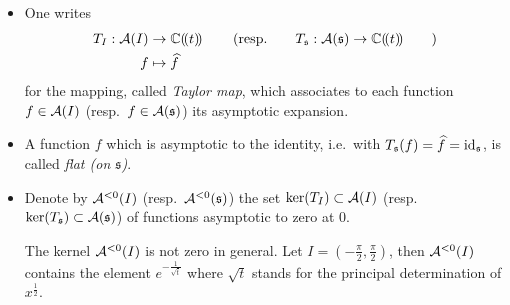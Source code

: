 \begin{defn}
  \begin{itemize}
    \item One writes
      \begin{align*}
        T_{I}:\mathcal{A}(I)&\to\mathbb{C}(\!(t)\!)
        \qquad\left(\text{resp.}\qquad
        T_{\mathfrak{s}}:\mathcal{A}(\mathfrak{s})\to\mathbb{C}(\!(t)\!)\qquad\right)
      \\f&\mapsto\widehat f
      \end{align*}
      for the mapping, called \emph{Taylor map}, which associates to each
      function $f\in\mathcal{A}(I)$ (resp.\ $f\in\mathcal{A}(\mathfrak{s})$) its asymptotic
      expansion.
    \item A function $f$ which is asymptotic to the identity, i.e.\ with
      $T_{\mathfrak{s}}(f)=\widehat f=\operatorname{id}_{\mathfrak{s}}$, is called \emph{flat (on
      $\mathfrak{s}$)}.
    \item Denote by $\mathcal{A}^{<0}(I)$ (resp.\ $\mathcal{A}^{<0}(\mathfrak{s})$) the set
      $\ker(T_{I})\subset\mathcal{A}(I)$ (resp.\
      $\ker(T_{\mathfrak{s}})\subset\mathcal{A}(\mathfrak{s})$) of functions asymptotic
      to zero at $0$.
      \begin{s-rem}
        The kernel $\mathcal{A}^{<0}(I)$ is not zero in general.
        Let $I=\left(-\frac{\pi}{2},\frac{\pi}{2}\right)$, then $\mathcal{A}^{<0}(I)$
        contains the element $e^{-\frac{1}{\sqrt{t}}}$ where $\sqrt{t}$ stands
        for the principal determination of $x^{\frac{1}{2}}$.
      \end{s-rem}
  \end{itemize}
\end{defn}

